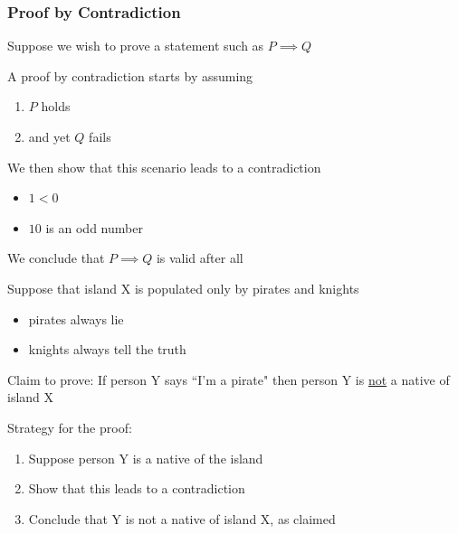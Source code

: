 \begin{frame}

    \frametitle{Proof by Contradiction}

    Suppose we wish to prove a statement such as $P \implies Q$

    A proof by contradiction starts by assuming 

    \begin{enumerate}
        \item $P$ holds
        \item and yet $Q$ fails
    \end{enumerate}
    
    We then show that this scenario leads to a contradiction

    \Egs 

    \begin{itemize}
        \item $1 < 0$
        \item $10$ is an odd number
    \end{itemize}

    We conclude that $P \implies Q$ is valid after all

\end{frame}

\begin{frame}
    
    \Eg Suppose that island X is populated only by pirates and knights

    \begin{itemize}
        \item pirates always lie
        \item knights always tell the truth
    \end{itemize}

    Claim to prove: If person Y says ``I'm a pirate" then person Y is
    \underline{not} a native of island X

    \vspace{1em}

    Strategy for the proof: 

    \begin{enumerate}
        \item Suppose person Y is a native of the island
        \item Show that this leads to a contradiction
        \item Conclude that Y is not a native of island X, as claimed
    \end{enumerate}
    

\end{frame}


